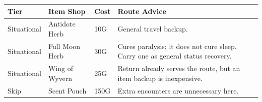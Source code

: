 \documentclass[
  american,
  10pt,
  letterpaper,
  oneside,
  open=any]{scrreprt}
\newcounter{none} %
\newenvironment{guidetable}{%
  \small\setstretch{1.0}%
  \setlength{\tabcolsep}{4pt}%
  \setlength{\LTpre}{8pt}\setlength{\LTpost}{10pt}%
  \renewcommand{\arraystretch}{1.16}%
}{ }
\begin{document}
\begin{guidetable}

{\def\LTcaptype{none} %
\begin{longtable}[]{@{}
  >{\raggedright\arraybackslash}p{}
  >{\raggedright\arraybackslash}p{}
  >{\raggedleft\arraybackslash}p{}
  >{\raggedright\arraybackslash}p{}@{}}
\toprule\noalign{}
\begin{minipage}[b]{\linewidth}\raggedright
\color{GuideGreen}\bfseries Tier
\end{minipage} & \begin{minipage}[b]{\linewidth}\raggedright
\color{GuideGreen}\bfseries Item Shop
\end{minipage} & \begin{minipage}[b]{\linewidth}\raggedleft
\color{GuideGreen}\bfseries Cost
\end{minipage} & \begin{minipage}[b]{\linewidth}\raggedright
\color{GuideGreen}\bfseries Route Advice
\end{minipage} \\
\midrule\noalign{}
\endhead
\bottomrule\noalign{}
\endlastfoot
Situational & Antidote Herb & 10G & General travel backup. \\
Situational & Full Moon Herb & 30G & Cures paralysis; it does not cure
sleep. Carry one as general status recovery. \\
Situational & Wing of Wyvern & 25G & Return already serves the route,
but an item backup is inexpensive. \\
Skip & Scent Pouch & 150G & Extra encounters are unnecessary here. \\
\end{longtable}
}

\end{guidetable}
\end{document}

